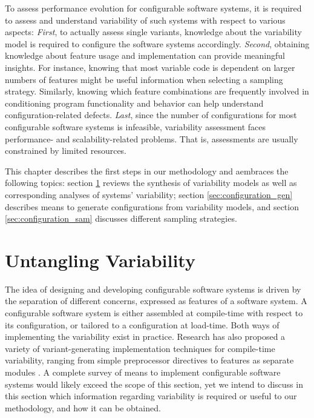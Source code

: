 To assess performance evolution for configurable software systems, it is
required to assess and understand variability of such systems with respect to
various aspects: \emph{First}, to actually assess single variants, knowledge
about the variability model is required to configure the software systems accordingly.
\emph{Second}, obtaining knowledge about feature usage and implementation can
provide meaningful insights. For instance, knowing that most variable code is dependent
on larger numbers of features might be useful information when selecting a
sampling strategy. Similarly, knowing which feature combinations are frequently
involved in conditioning program functionality and behavior can help understand
configuration-related defects. \emph{Last}, since the number of configurations
for most configurable software systems is infeasible, variability assessment faces
performance- and scalability-related problems. That is, assessments are usually
constrained by limited resources.

This chapter describes the first steps in our methodology and
aembraces the following topics: section \ref{sec:untangling} reviews the
synthesis of variability models as well as corresponding analyses of systems' variability;
section \ref{sec:configuration_gen} describes means to generate configurations from variability
models, and section \ref{sec:configuration_sam} discusses different sampling
strategies.

\section{Untangling Variability}\label{sec:untangling}
The idea of designing and developing configurable software systems is driven by
the separation of different concerns, expressed as features of a software
system. A configurable software system is either assembled at compile-time with
respect to its configuration, or tailored to a configuration at
load-time. Both ways of implementing the variability exist in practice. Research
has also proposed a variety of variant-generating implementation techniques for
compile-time variability, ranging from simple preprocessor directives to
features as separate modules \citep{kastner_model_2009}.  A complete survey of means to implement
configurable software systems would likely exceed the scope of this section, yet we intend to discuss in this
section which information regarding variability is required or useful to our
methodology, and how it can be obtained.

